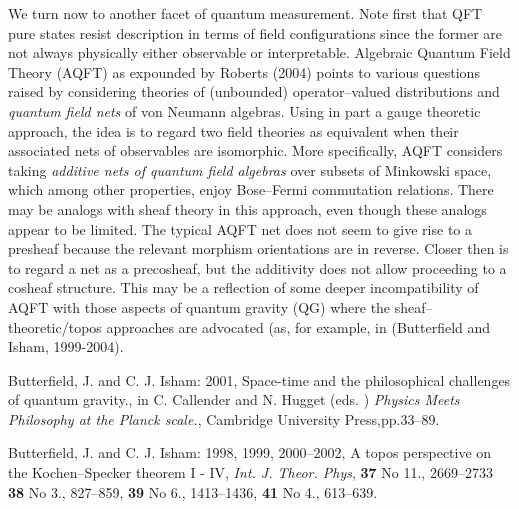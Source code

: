 \documentclass[12pt]{article}
\theoremstyle{plain}
\theoremstyle{definition}
\numberwithin{equation}{section}
\begin{document}
    We turn now to another facet of quantum measurement. Note first that QFT 
pure states resist description in terms of field configurations since the former are not 
always physically either observable or interpretable. Algebraic Quantum Field Theory (AQFT) as 
expounded by Roberts (2004) points to various questions raised by considering theories of 
(unbounded) operator--valued distributions and \emph{quantum field nets} of von Neumann 
algebras. Using in part a gauge theoretic approach, the idea is to regard two field theories 
as equivalent when their associated nets of observables are isomorphic. More specifically, 
AQFT considers taking \emph{additive nets of quantum field algebras} over subsets of Minkowski 
space, which among other properties, enjoy Bose--Fermi commutation relations. There may be 
analogs with sheaf theory in this approach, even though these analogs appear to be limited. 
The typical AQFT net does not seem to give rise to a presheaf because the relevant morphism 
orientations are in reverse. Closer then is to regard a net as a precosheaf, but the 
additivity does not allow proceeding to  a cosheaf structure. This may be a reflection of some 
deeper incompatibility of AQFT with those aspects of quantum gravity (QG) where the sheaf--
theoretic/topos approaches are advocated (as, for example, in \cite {BIsham1} (Butterfield and 
Isham, 1999-2004).

\begin{thebibliography}{9}
Butterfield, J. and C. J. Isham: 2001, Space-time and the
philosophical challenges of quantum gravity., in C. Callender and
N. Hugget (eds. ) \emph{Physics Meets Philosophy at the Planck
scale.}, Cambridge University Press,pp.33--89.

Butterfield, J. and C. J. Isham: 1998, 1999, 2000--2002, A topos
perspective on the Kochen--Specker theorem I - IV, \emph{Int. J.
Theor. Phys}, \textbf{37}  No 11., 2669--2733 \textbf{38} No 3.,
827--859, \textbf{39} No 6., 1413--1436, \textbf{41} No 4.,
613--639.

\end{thebibliography}
\end{document}
